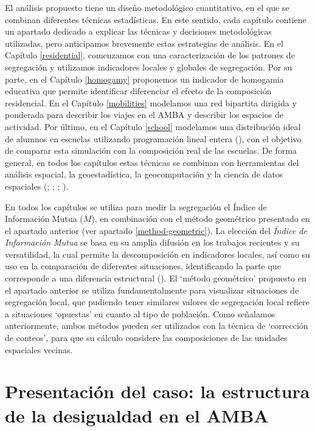 \documentclass[
  spanish,
  a4paper,%
  chapterprefix=true,%
  DIV=calc,%
  twoside]{scrbook}%
\begin{document}
El análisis propuesto tiene un diseño metodológico cuantitativo, en el
que se combinan diferentes técnicas estadísticas. En este sentido, cada
capítulo contiene un apartado dedicado a explicar las técnicas y
decisiones metodológicas utilizadas, pero anticipamos brevemente estas
estrategias de análisis. En el Capítulo \ref{residential}, comenzamos
con una caracterización de los patrones de segregación y utilizamos
indicadores locales y globales de segregación. Por su parte, en el
Capítulo \ref{homogamy} proponemos un indicador de homogamia educativa
que permite identificar diferenciar el efecto de la composición
residencial. En el Capítulo \ref{mobilities} modelamos una red
bipartita dirigida y ponderada para describir los viajes en el AMBA y
describir los espacios de actividad. Por último, en el Capítulo
\ref{school} modelamos una distribución ideal de alumnos en escuelas
utilizando programación lineal entera (), con el objetivo
de comparar esta simulación con la composición real de las escuelas. De
forma general, en todos los capítulos estas técnicas se combinan con
herramientas del análisis espacial, la geoestadística, la geocomputación
y la ciencia de datos espaciales (; ; ; ).

En todos los capítulos se utiliza para medir la segregación el Índice de
Información Mutua (\(M\)), en combinación con el método geométrico
presentado en el apartado anterior (ver apartado
\ref{method-geometric}). La elección del \emph{Índice de Información Mutua}
se basa en su amplia difusión en los trabajos recientes y su
versatilidad, la cual permite la descomposición en indicadores locales,
así como su uso en la comparación de diferentes situaciones,
identificando la parte que corresponde a una diferencia estructural
(). El `método geométrico' propuesto en el apartado anterior
se utiliza fundamentalmente para visualizar situaciones de segregación
local, que pudiendo tener similares valores de segregación local refiere
a situaciones `opuestas' en cuanto al tipo de población. Como señalamos
anteriormente, ambos métodos pueden ser utilizados con la técnica de
`corrección de conteos', para que su cálculo considere las composiciones
de las unidades espaciales vecinas.

\section{Presentación del caso: la estructura de la desigualdad en el AMBA}\label{method-AMBA}
\end{document}
